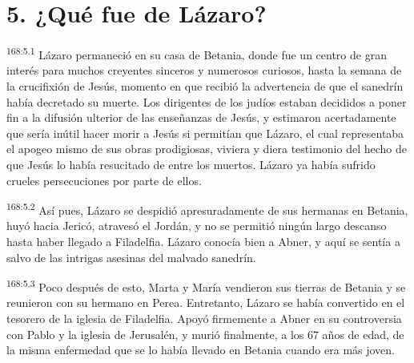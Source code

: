 \section*{5. ¿Qué fue de Lázaro?}
\par
\textsuperscript{168:5.1} Lázaro permaneció en su casa de Betania, donde fue un centro de gran interés para muchos creyentes sinceros y numerosos curiosos, hasta la semana de la crucifixión de Jesús, momento en que recibió la advertencia de que el sanedrín había decretado su muerte. Los dirigentes de los judíos estaban decididos a poner fin a la difusión ulterior de las enseñanzas de Jesús, y estimaron acertadamente que sería inútil hacer morir a Jesús si permitían que Lázaro, el cual representaba el apogeo mismo de sus obras prodigiosas, viviera y diera testimonio del hecho de que Jesús lo había resucitado de entre los muertos. Lázaro ya había sufrido crueles persecuciones por parte de ellos.

\par
\textsuperscript{168:5.2} Así pues, Lázaro se despidió apresuradamente de sus hermanas en Betania, huyó hacia Jericó, atravesó el Jordán, y no se permitió ningún largo descanso hasta haber llegado a Filadelfia. Lázaro conocía bien a Abner, y aquí se sentía a salvo de las intrigas asesinas del malvado sanedrín.

\par
\textsuperscript{168:5.3} Poco después de esto, Marta y María vendieron sus tierras de Betania y se reunieron con su hermano en Perea. Entretanto, Lázaro se había convertido en el tesorero de la iglesia de Filadelfia. Apoyó firmemente a Abner en su controversia con Pablo y la iglesia de Jerusalén, y murió finalmente, a los 67 años de edad, de la misma enfermedad que se lo había llevado en Betania cuando era más joven.